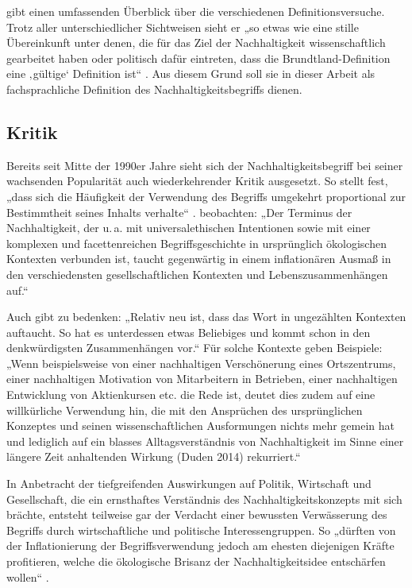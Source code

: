 \documentclass[
    german,
    a4paper,%
    12pt,%
    oneside,%
    toc=bibliography,
    final,
]{scrartcl}
\begin{document}
\citet[51ff.]{Ninck1997} gibt einen umfassenden Überblick über die verschiedenen Definitionsversuche. Trotz aller unterschiedlicher Sichtweisen sieht er „so etwas wie eine stille Übereinkunft unter denen, die für das Ziel der Nachhaltigkeit wissenschaftlich gearbeitet haben oder politisch dafür eintreten, dass die Brundtland-Definition eine ‚gültige‘ Definition ist“ \citep[54]{Ninck1997}. Aus diesem Grund soll sie in dieser Arbeit als fachsprachliche Definition des Nachhaltigkeitsbegriffs dienen.

\subsection{Kritik}
\label{subsec:kritik}

Bereits seit Mitte der 1990er Jahre sieht sich der Nachhaltigkeitsbegriff bei seiner wachsenden Popularität auch wiederkehrender Kritik ausgesetzt. So stellt \citet[178]{Görg1996} fest, „dass sich die Häufigkeit der Verwendung des Begriffs umgekehrt proportional zur Bestimmtheit seines Inhalts verhalte“ \citep[zitiert nach ][140]{Vogel2011}. \citet[5]{OhlmeierBrunold2015} beobachten: „Der Terminus der Nachhaltigkeit, der u.\,a. mit universalethischen Intentionen sowie mit einer komplexen und facettenreichen Begriffsgeschichte in ursprünglich ökologischen Kontexten verbunden ist, taucht gegenwärtig in einem inflationären Ausmaß in den verschiedensten gesellschaftlichen Kontexten und Lebenszusammenhängen auf.“

Auch \citet[46]{Ninck1997} gibt zu bedenken: „Relativ neu ist, dass das Wort in ungezählten Kontexten auftaucht. So hat es unterdessen etwas Beliebiges und kommt schon in den denkwürdigsten Zusammenhängen vor.“ Für solche Kontexte geben \citet[5]{OhlmeierBrunold2015} Beispiele: „Wenn beispielsweise von einer nachhaltigen Verschönerung eines Ortszentrums, einer nachhaltigen Motivation von Mitarbeitern in Betrieben, einer nachhaltigen Entwicklung von Aktienkursen etc. die Rede ist, deutet dies zudem auf eine willkürliche Verwendung hin, die mit den Ansprüchen des ursprünglichen Konzeptes und seinen wissenschaftlichen Ausformungen nichts mehr gemein hat und lediglich auf ein blasses Alltagsverständnis von Nachhaltigkeit im Sinne einer längere Zeit anhaltenden Wirkung (Duden 2014) rekurriert.“

In Anbetracht der tiefgreifenden Auswirkungen auf Politik, Wirtschaft und Gesellschaft, die ein ernsthaftes Verständnis des Nachhaltigkeitskonzepts mit sich brächte, entsteht teilweise gar der Verdacht einer bewussten Verwässerung des Begriffs durch wirtschaftliche und politische Interessengruppen. So „dürften von der Inflationierung der Begriffsverwendung jedoch am ehesten diejenigen Kräfte profitieren, welche die ökologische Brisanz der Nachhaltigkeitsidee entschärfen wollen“ \citep[6]{OhlmeierBrunold2015}.
\end{document}
